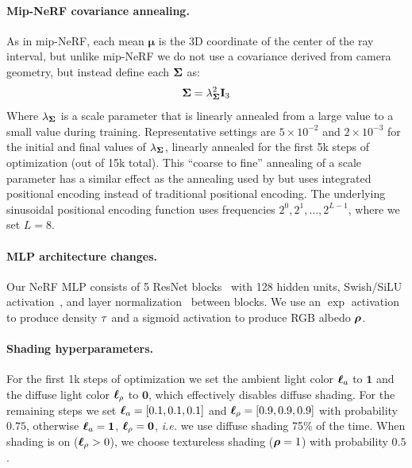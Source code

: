 \documentclass{article} %
\begin{document}
\paragraph{Mip-NeRF covariance annealing.} As in mip-NeRF, each mean $\boldsymbol{\mu}$ is the 3D coordinate of the center of the ray interval, but unlike mip-NeRF we do not use a covariance derived from camera geometry, but instead define each $\boldsymbol{\Sigma}$ as:
\begin{equation}
\boldsymbol{\Sigma} = \lambda_{\boldsymbol{\Sigma}}^2 \mathbf{I}_3
\end{equation}
Where $\lambda_{\boldsymbol{\Sigma}}$ is a scale parameter that is linearly annealed from a large value to a small value during training. Representative settings are $5 \times 10^{-2}$ and $2 \times 10^{-3}$ for the initial and final values of $\lambda_{\boldsymbol{\Sigma}}$, linearly annealed for the first 5k steps of optimization (out of 15k total).
This ``coarse to fine'' annealing of a scale parameter has a similar effect as the annealing used by \citet{park2021nerfies} but uses integrated positional encoding instead of traditional positional encoding. The underlying sinusoidal positional encoding function uses frequencies ${2^0, 2^1, \ldots, 2^{L-1}}$, where we set $L=8$.


\paragraph{MLP architecture changes.} Our NeRF MLP consists of 5 ResNet blocks~\citep{he2016deep} with 128 hidden units, Swish/SiLU activation~\citep{hendrycks2016gaussian}, and layer normalization~\citep{ba2016layer} between blocks. We use an $\operatorname{exp}$ activation to produce density $\tau$ and a sigmoid activation to produce RGB albedo $\boldsymbol{\rho}$.

\paragraph{Shading hyperparameters.} For the first 1k steps of optimization we set the ambient light color $\boldsymbol{\ell}_a $ to $\mathbf{1}$ and the diffuse light color $\boldsymbol{\ell}_{\rho}$ to $\mathbf{0}$, which effectively disables diffuse shading. For the remaining steps we set $\boldsymbol{\ell}_a = [0.1, 0.1, 0.1]$ and $\boldsymbol{\ell}_{\rho}=[0.9, 0.9, 0.9]$ with probability $0.75$, otherwise $\boldsymbol{\ell}_a = \mathbf{1}$, $\boldsymbol{\ell}_{\rho} = \mathbf{0}$, \textit{i.e.} we use diffuse shading 75\% of the time. When shading is on ($\boldsymbol{\ell}_{\rho}>0$), we choose textureless shading ($\boldsymbol{\rho}=1$) with probability $0.5$.
\end{document}
